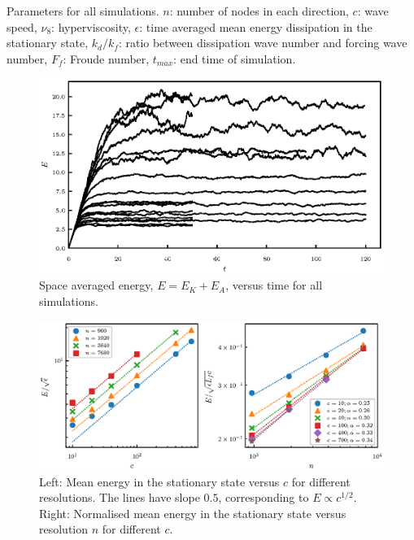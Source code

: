 \begin{table}
\begin{center}
\vskip 3mm
\caption{Parameters for all simulations. $ n $: number of nodes in each
direction, $ c $: wave speed, $ \nu_8 $: hyperviscosity, $ \epsilon $: time
averaged mean energy dissipation in the stationary state, $ k_{d}/ k_f $: ratio
between dissipation wave number and forcing wave number, $ F_f $: Froude
number, $ t_{max} $: end time of simulation.}
\end{center}
\end{table}





\begin{figure}
\centerline{\includegraphics[]{paper_04_shallow_water/Pyfig/fig1}}
\caption{Space averaged energy, $E = E_K + E_A $, versus time for all
simulations. }
\label{fig_Evstime}
\end{figure}

\begin{figure}
\centerline{\includegraphics[]{paper_04_shallow_water/Pyfig/fig2}}
\caption{Left: Mean energy in the stationary state versus $ c $ for different
resolutions. The lines have slope $ 0.5 $, corresponding to $ E \propto c^{1/2}
$. Right: Normalised mean energy in the stationary state versus resolution $ n
$ for different $ c $.}
\label{MeanE}
\end{figure}



